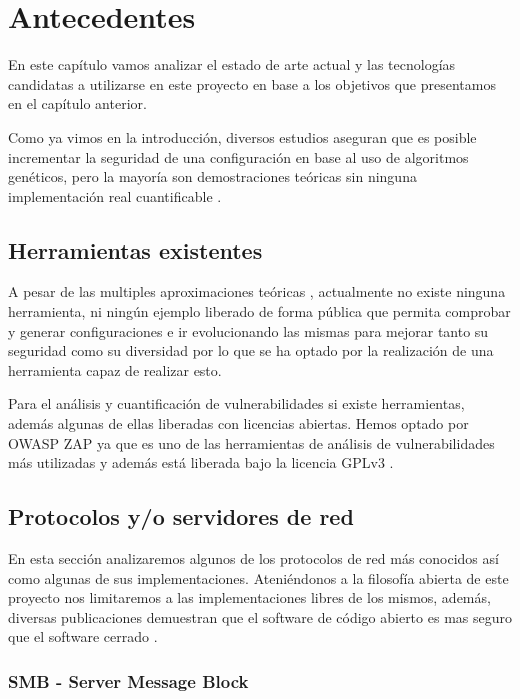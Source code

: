 \chapter{Antecedentes}

En este capítulo vamos analizar el estado de arte actual y las tecnologías candidatas a utilizarse en este proyecto en base a los objetivos que presentamos en el capítulo anterior.


\bigskip
Como ya vimos en la introducción, diversos estudios aseguran que es posible incrementar la seguridad de una configuración en base al uso de algoritmos genéticos, pero la mayoría son demostraciones teóricas sin ninguna implementación real cuantificable  \cite{john_evolutionary_2014} \cite{romero_sistema_2017} \cite{buji_genetic_2017}. 

\section{Herramientas existentes}
A pesar de las multiples aproximaciones teóricas \cite{schlenker_deceiving_2018} \cite{champagne_genetic_2018}, actualmente no existe ninguna herramienta, ni ningún ejemplo liberado de forma pública que permita comprobar y generar configuraciones e ir evolucionando las mismas para mejorar tanto su seguridad como su diversidad por lo que se ha optado por la realización de una herramienta capaz de realizar esto.

\bigskip
Para el análisis y cuantificación de vulnerabilidades si existe herramientas, además algunas de ellas liberadas con licencias abiertas. Hemos optado por OWASP ZAP ya que es uno de las herramientas de análisis de vulnerabilidades más utilizadas y además está liberada bajo la licencia GPLv3 \cite{free_software_foundation_gnu_2007}.

\section {Protocolos y/o servidores de red}

En esta sección analizaremos algunos de los protocolos de red más conocidos así como algunas de sus implementaciones. Ateniéndonos a la filosofía abierta de este proyecto nos limitaremos a las implementaciones libres de los mismos, además, diversas publicaciones demuestran que el software de código abierto es mas seguro que el software cerrado \cite{walia_comparative_2006} \cite{mansfield-devine_open_2008} \cite{clark_is_2009}.

\subsection {SMB - Server Message Block}

